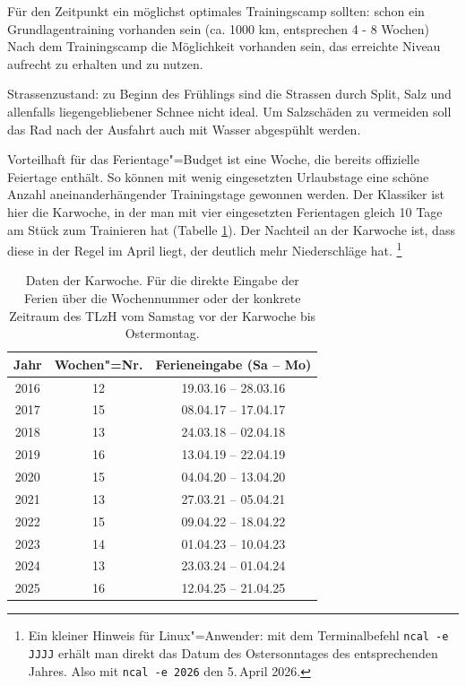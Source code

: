 \documentclass[a4paper,DIV13,BCOR0cm,draft=TRUE]{scrartcl}
\newcommand{\tlzh}{TLzH}
\begin{document}
Für den Zeitpunkt ein möglichst optimales Trainingscamp sollten:
schon ein Grundlagentraining vorhanden sein (ca. 1000 km, entsprechen 4 - 8 Wochen)
Nach dem Trainingscamp die Möglichkeit vorhanden sein, das erreichte Niveau aufrecht zu erhalten und zu nutzen.

Strassenzustand:
zu Beginn des Frühlings sind die Strassen durch Split, Salz und allenfalls liegengebliebener Schnee nicht ideal.
Um Salzschäden zu vermeiden soll das Rad nach der Ausfahrt auch mit Wasser abgespühlt werden.

Vorteilhaft für das Ferientage"=Budget ist eine Woche,
die bereits offizielle Feiertage enthält.
So können mit wenig eingesetzten Urlaubstage eine schöne Anzahl
aneinanderhängender Trainingstage gewonnen werden.
Der Klassiker ist hier die Karwoche,
in der man mit vier eingesetzten Ferientagen gleich 10 Tage am Stück zum Trainieren hat
(Tabelle \ref{tab:karwoche}).
Der Nachteil an der Karwoche ist, dass diese in der Regel im April liegt,
der deutlich mehr Niederschläge hat.
\footnote{Ein kleiner Hinweis für Linux"=Anwender:
mit dem Terminalbefehl \texttt{ncal -e JJJJ} erhält man direkt das
Datum des Ostersonntages des entsprechenden Jahres. Also mit \texttt{ncal -e 2026}
den 5.\,April 2026.}

\begin{table}
        \centering
        \begin{tabular}{ccc}
                \toprule
                    Jahr & Wochen"=Nr. & Ferieneingabe (Sa -- Mo)\\
                \midrule
                    2016 & 12 & 19.03.16 -- 28.03.16 \\
                    2017 & 15 & 08.04.17 -- 17.04.17 \\
                    2018 & 13 & 24.03.18 -- 02.04.18 \\
                    2019 & 16 & 13.04.19 -- 22.04.19 \\
                    2020 & 15 & 04.04.20 -- 13.04.20 \\
                    2021 & 13 & 27.03.21 -- 05.04.21 \\
                    2022 & 15 & 09.04.22 -- 18.04.22 \\
                    2023 & 14 & 01.04.23 -- 10.04.23 \\
                    2024 & 13 & 23.03.24 -- 01.04.24 \\
                    2025 & 16 & 12.04.25 -- 21.04.25 \\
                \bottomrule
        \end{tabular}
        \caption{Daten der Karwoche.
            Für die direkte Eingabe der Ferien über die Wochennummer oder
            der konkrete Zeitraum des \tlzh{} vom Samstag vor der Karwoche bis Ostermontag.}
        \label{tab:karwoche}
\end{table}
\end{document}
